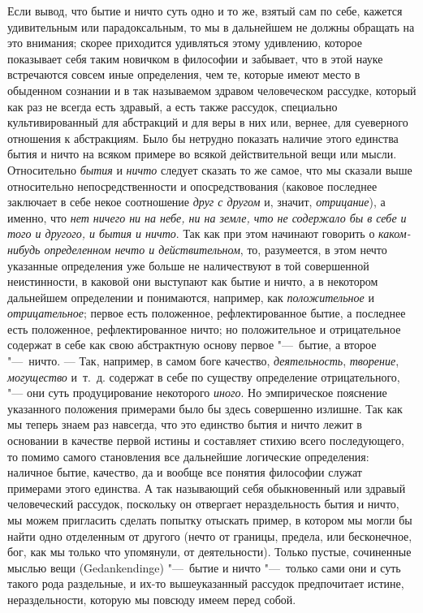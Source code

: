 Если вывод, что бытие и ничто суть одно и то же, взятый сам по себе, кажется
удивительным или парадоксальным, то мы в дальнейшем не должны обращать на
это внимания; скорее приходится удивляться этому удивлению, которое
показывает себя таким новичком в философии и забывает, что в этой науке
встречаются совсем иные определения, чем те, которые имеют место в
обыденном сознании и в так называемом здравом человеческом рассудке,
который как раз не всегда есть здравый, а есть также рассудок, специально
культивированный для абстракций и для веры в них или, вернее, для
суеверного отношения к абстракциям. Было бы нетрудно показать наличие этого
единства бытия и ничто на всяком примере во всякой действительной вещи или
мысли. Относительно {\em бытия} и
{\em ничто} следует сказать то же самое, что мы сказали
выше относительно непосредственности и опосредствования (каковое последнее
заключает в себе некое соотношение {\em друг с другом}
и, значит, {\em отрицание}), а именно, что
{\em нет ничего ни на небе, ни на земле, что не
содержало бы в себе и того и другого, и бытия и ничто}. Так как при этом
начинают говорить о {\em каком-нибудь определенном
нечто и действительном}, то, разумеется, в этом нечто указанные определения
уже больше не наличествуют в той совершенной неистинности, в каковой они
выступают как бытие и ничто, а в некотором дальнейшем определении и
понимаются, например, как {\em положительное} и
{\em отрицательное}; первое есть положенное,
рефлектированное бытие, а последнее есть положенное, рефлектированное
ничто; но положительное и отрицательное содержат в себе как свою
абстрактную основу первое "---~бытие, а второе "---~ничто. --- Так, например, в
самом боге качество, {\em деятельность}, {\em творение}, {\em могущество}
и~т.~д. содержат в себе по существу определение отрицательного, "--- они суть
продуцирование некоторого {\em иного}. Но
эмпирическое пояснение указанного положения примерами было бы здесь
совершенно излишне. Так как мы теперь знаем раз навсегда, что это единство
бытия и ничто лежит в основании в качестве первой истины и составляет
стихию всего последующего, то помимо самого становления все дальнейшие
логические определения: наличное бытие, качество, да и вообще все понятия
философии служат примерами этого единства. А так называющий себя
обыкновенный или здравый человеческий рассудок, поскольку он отвергает
нераздельность бытия и ничто, мы можем пригласить сделать попытку отыскать
пример, в котором мы могли бы найти одно отделенным от другого (нечто от
границы, предела, или бесконечное, бог, как мы только что упомянули, от
деятельности). Только пустые, сочиненные мыслью вещи (Gedankendinge)
"---~бытие и ничто "---~только сами они и суть такого рода раздельные, и их-то
вышеуказанный рассудок предпочитает истине, нераздельности, которую мы
повсюду имеем перед собой.

